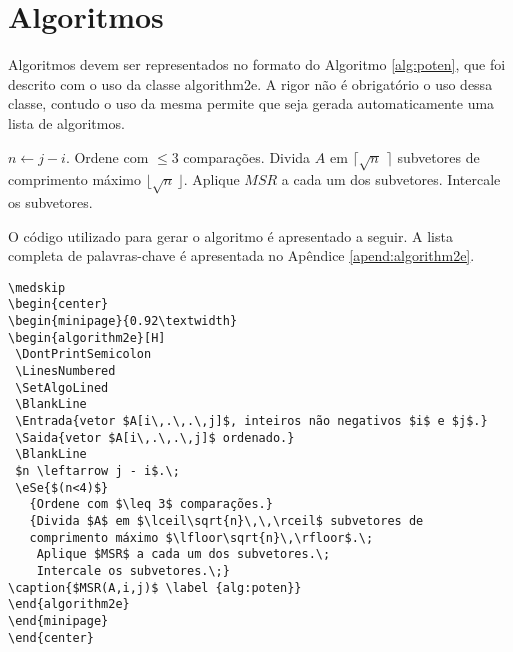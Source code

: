 \section{Algoritmos}
\label{sec:algor} 
Algoritmos devem ser representados no formato do Algoritmo \ref{alg:poten}, que foi descrito com o uso da classe \textsf{algorithm2e}. A rigor não é obrigatório o uso dessa classe, contudo o uso da mesma permite que seja gerada automaticamente uma lista de algoritmos.

\medskip
\begin{center}
\begin{minipage}{0.92\textwidth}
\begin{algorithm2e}[H]
 \DontPrintSemicolon
 \LinesNumbered
 \SetAlgoLined
 \BlankLine
 \BlankLine
 $n \leftarrow j - i$.\;
   {Ordene com $\leq 3$ comparações.}
   {Divida $A$ em $\lceil\sqrt{n}\,\,\rceil$ subvetores de comprimento máximo $\lfloor\sqrt{n}\,\rfloor$.\;
    Aplique $MSR$ a cada um dos subvetores.\;
    Intercale os subvetores.\;}
\caption{$MSR(A,i,j)$ \label {alg:poten}}
\end{algorithm2e}
\end{minipage}
\end{center}

O código utilizado para gerar o algoritmo é apresentado a seguir. A lista completa de palavras-chave é apresentada no Apêndice \ref{apend:algorithm2e}.

\begin{verbatim}
\medskip
\begin{center}
\begin{minipage}{0.92\textwidth}
\begin{algorithm2e}[H]
 \DontPrintSemicolon
 \LinesNumbered
 \SetAlgoLined
 \BlankLine
 \Entrada{vetor $A[i\,.\,.\,j]$, inteiros não negativos $i$ e $j$.}
 \Saida{vetor $A[i\,.\,.\,j]$ ordenado.}
 \BlankLine
 $n \leftarrow j - i$.\;
 \eSe{$(n<4)$}
   {Ordene com $\leq 3$ comparações.}
   {Divida $A$ em $\lceil\sqrt{n}\,\,\rceil$ subvetores de 
   comprimento máximo $\lfloor\sqrt{n}\,\rfloor$.\;
    Aplique $MSR$ a cada um dos subvetores.\;
    Intercale os subvetores.\;}
\caption{$MSR(A,i,j)$ \label {alg:poten}}
\end{algorithm2e}
\end{minipage}
\end{center}
\end{verbatim}

